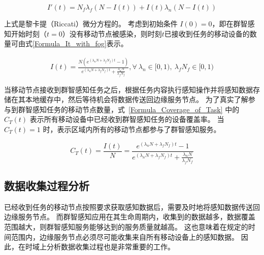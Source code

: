 \begin{equation}
  \label{Formula_SIR_with_fog}
  I'(t) = N_f \lambda_f (N-I(t)) + I(t) \lambda_n (N-I(t))
\end{equation}

上式是黎卡提（Riccati）微分方程的。
考虑到初始条件 $I(0)=0$，即在群智感知开始时刻（$t=0$）没有移动节点被感染，则时刻$t$已接收到任务的移动设备的数量可由式\eqref{Formula_It_with_fog}表示。

\begin{equation}
\label{Formula_It_with_fog}
\begin{aligned}
I(t) = \frac{N (e^{(\lambda_n N + \lambda_f N_f) t} - 1)}{e^{(\lambda_n N + \lambda_f N_f) t} + \frac{\lambda_n N}{\lambda_f N_f}}, \forall\ \lambda_n \in [0, 1),\ \lambda_f N_f \in [0, 1)
\end{aligned}
\end{equation}


当移动节点接收到群智感知任务之后，根据任务内容执行感知操作并将感知数据存储在其本地缓存中，然后等待机会将数据传送回边缘服务节点。
为了真实了解参与到群智感知任务的移动节点数量，式~\eqref{Formula_Coverage_of_Task} 中的 $C_T(t)$ 表示所有移动设备中已经收到群智感知任务的设备覆盖率。
当 $C_T(t)=1$ 时，表示区域内所有的移动节点都参与了群智感知服务。

\begin{equation}
  \label{Formula_Coverage_of_Task}
  C_T(t) = \frac{I(t)}{N} = \frac{e^{(\lambda_n N + \lambda_f N_f) t} - 1}{e^{(\lambda_n N + \lambda_f N_f) t} + \frac{\lambda_n N}{\lambda_f N_f}}
\end{equation}

\subsection{数据收集过程分析}

已经收到任务的移动节点按照要求获取感知数据后，需要及时地将感知数据传送回边缘服务节点。
而群智感知应用在其生命周期内，收集到的数据越多，数据覆盖范围越大，则群智感知服务能够达到的服务质量就越高。
这也意味着在规定的时间范围内，边缘服务节点必须尽可能收集来自所有移动设备上的感知数据。
因此，在时域上分析数据收集过程也是非常重要的工作。

